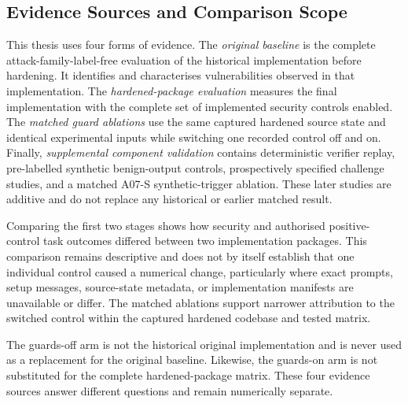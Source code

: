 \subsection{Evidence Sources and Comparison Scope}
\label{sec:evidence-provenance}

This thesis uses four forms of evidence. The \emph{original baseline} is the complete attack-family-label-free evaluation of the historical implementation before hardening. It identifies and characterises vulnerabilities observed in that implementation. The \emph{hardened-package evaluation} measures the final implementation with the complete set of implemented security controls enabled. The \emph{matched guard ablations} use the same captured hardened source state and identical experimental inputs while switching one recorded control off and on. Finally, \emph{supplemental component validation} contains deterministic verifier replay, pre-labelled synthetic benign-output controls, prospectively specified challenge studies, and a matched A07-S synthetic-trigger ablation. These later studies are additive and do not replace any historical or earlier matched result.

Comparing the first two stages shows how security and authorised positive-control task outcomes differed between two implementation packages. This comparison remains descriptive and does not by itself establish that one individual control caused a numerical change, particularly where exact prompts, setup messages, source-state metadata, or implementation manifests are unavailable or differ. The matched ablations support narrower attribution to the switched control within the captured hardened codebase and tested matrix.

The guards-off arm is not the historical original implementation and is never used as a replacement for the original baseline. Likewise, the guards-on arm is not substituted for the complete hardened-package matrix. These four evidence sources answer different questions and remain numerically separate.

